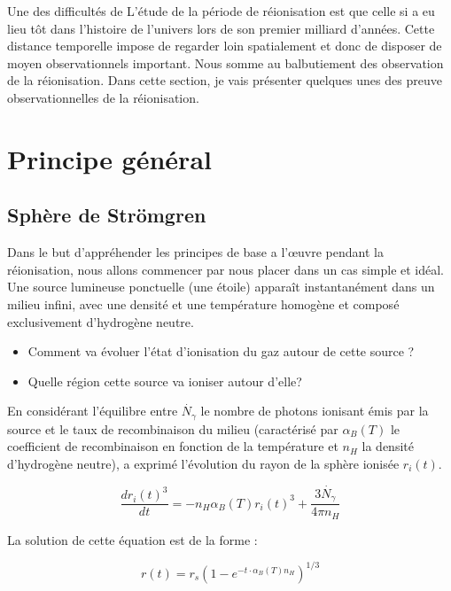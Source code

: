 Une des difficultés de L’étude de la période de réionisation est que celle si a eu lieu tôt dans l'histoire de l'univers lors de son premier milliard d'années.
Cette distance temporelle impose de regarder loin spatialement et donc de disposer de moyen observationnels important.
Nous somme au balbutiement des observation de la réionisation.
Dans cette section, je vais présenter quelques unes des preuve observationnelles de la réionisation. 

\section{Principe général}

\subsection{Sphère de Strömgren}

Dans le but d’appréhender les principes de base a l’œuvre pendant la réionisation, nous allons commencer par nous placer dans un cas simple et idéal.
Une source lumineuse ponctuelle (une étoile) apparaît instantanément dans un milieu infini, avec une densité et une température homogène et composé exclusivement d’hydrogène neutre.

\begin{itemize}
\item Comment va évoluer l’état d'ionisation du gaz autour de cette source ?
\item Quelle région cette source va ioniser autour d'elle?
\end{itemize}

En considérant l'équilibre entre $\dot{N_\gamma}$ le nombre de photons ionisant émis par la source et le taux de recombinaison du milieu (caractérisé par $\alpha_B(T)$ le coefficient de recombinaison en fonction de la température et $n_H$ la densité d'hydrogène neutre), \cite{stromgren_physical_1939} a exprimé l'évolution du rayon de la sphère ionisée $r_i(t)$.


\begin{equation}
\frac{dr_i(t)^3}{dt} = -n_H \alpha_B(T)r_i (t)^3 + \frac{3 \dot{N_\gamma} }{4 \pi n_H}
\end{equation}


La solution de cette équation est de la forme :

\begin{equation}
r(t) = r_s \left( 1 - e^{-t\cdot \alpha_B(T) n_H } \right)^{1/3}
\end{equation}

